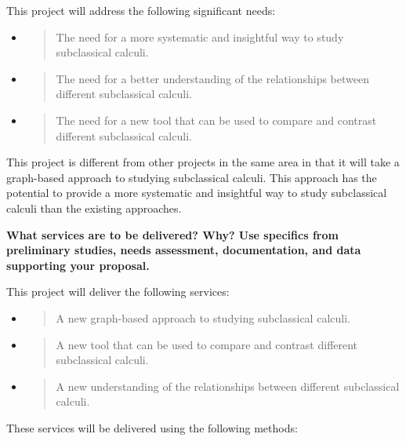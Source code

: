 This project will address the following significant needs:

\begin{itemize}
\item
  \begin{quote}
  The need for a more systematic and insightful way to study
  subclassical calculi.
  \end{quote}
\item
  \begin{quote}
  The need for a better understanding of the relationships between
  different subclassical calculi.
  \end{quote}
\item
  \begin{quote}
  The need for a new tool that can be used to compare and contrast
  different subclassical calculi.
  \end{quote}
\end{itemize}

This project is different from other projects in the same area in that
it will take a graph-based approach to studying subclassical calculi.
This approach has the potential to provide a more systematic and
insightful way to study subclassical calculi than the existing
approaches.

\textbf{What services are to be delivered? Why? Use specifics from
preliminary studies, needs assessment, documentation, and data
supporting your proposal.}

This project will deliver the following services:

\begin{itemize}
\item
  \begin{quote}
  A new graph-based approach to studying subclassical calculi.
  \end{quote}
\item
  \begin{quote}
  A new tool that can be used to compare and contrast different
  subclassical calculi.
  \end{quote}
\item
  \begin{quote}
  A new understanding of the relationships between different
  subclassical calculi.
  \end{quote}
\end{itemize}

These services will be delivered using the following methods:

